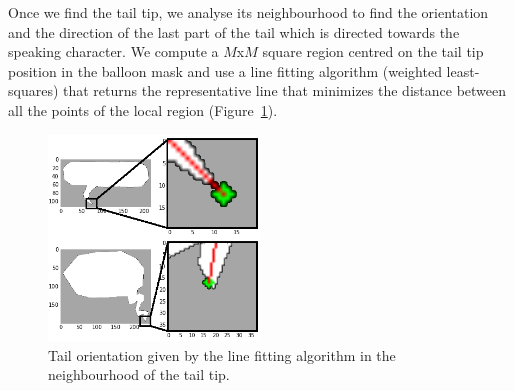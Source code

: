 

Once we find the tail tip, we analyse its neighbourhood to find the orientation and the direction of the last part of the tail which is directed towards the speaking character.
We compute a $M$x$M$ square region centred on the tail tip position in the balloon mask and use a line fitting algorithm (weighted least-squares) that returns the representative line that minimizes the distance between all the points of the local region (Figure~\ref{fig:se:orientation}).


    \begin{figure}[ht]%
      \centering
      \includegraphics[width=0.5\textwidth]{tail_direction.png}
    \caption[Tail orientation given by the line fitting algorithm in the neighbourhood of the tail tip]{Tail orientation given by the line fitting algorithm in the neighbourhood of the tail tip.}
    \label{fig:se:orientation}
    \end{figure}  


